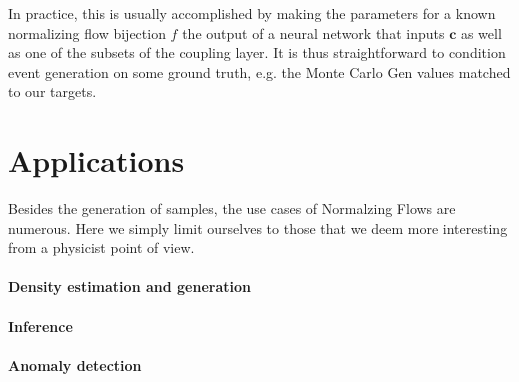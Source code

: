 In practice, this is usually accomplished by making the parameters for a known normalizing flow bijection $f$ the output of a neural network that inputs $\mathbf{c}$ as well as one of the subsets of the coupling layer. It is thus straightforward to condition event generation on some ground truth, e.g. the Monte Carlo Gen values matched to our targets.


\section{Applications}

Besides the generation of samples, the use cases of Normalzing Flows are numerous. 
Here we simply limit ourselves to those that we deem more interesting from a physicist point of view.

\paragraph{Density estimation and generation}

\paragraph{Inference}

\paragraph{Anomaly detection}
